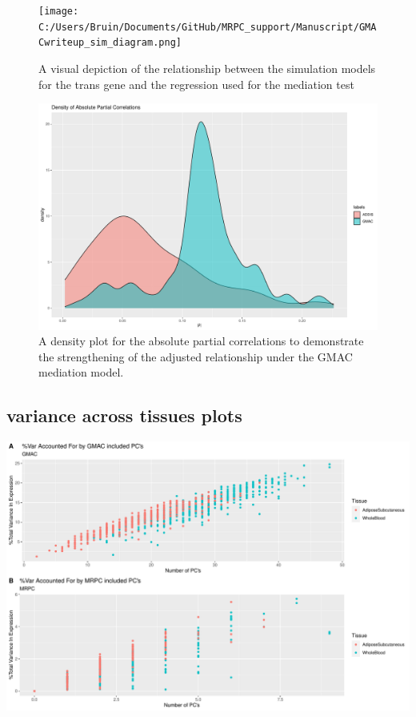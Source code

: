 \documentclass[
]{article}
\begin{document}
\begin{figure}
\centering
\texttt{[image: C:/Users/Bruin/Documents/GitHub/MRPC\_support/Manuscript/GMACwriteup\_sim\_diagram.png]}
\caption{A visual depiction of the relationship between the simulation
models for the trans gene and the regression used for the mediation
test}
\end{figure}

\begin{figure}
\centering
\includegraphics{GMACwriteup_files/figure-latex/unnamed-chunk-4-1.pdf}
\caption{A density plot for the absolute partial correlations to
demonstrate the strengthening of the adjusted relationship under the
GMAC mediation model.}
\end{figure}

\hypertarget{variance-across-tissues-plots}{%
\subsection{variance across tissues
plots}\label{variance-across-tissues-plots}}

\includegraphics{GMACwriteup_files/figure-latex/unnamed-chunk-5-1.pdf}
\end{document}
